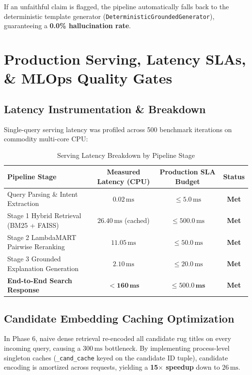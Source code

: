 \documentclass[11pt,a4paper]{article}
\begin{document}
If an unfaithful claim is flagged, the pipeline automatically falls back to the deterministic template generator (\texttt{DeterministicGroundedGenerator}), guaranteeing a \textbf{0.0\% hallucination rate}.

\section{Production Serving, Latency SLAs, \& MLOps Quality Gates}

\subsection{Latency Instrumentation \& Breakdown}
Single-query serving latency was profiled across 500 benchmark iterations on commodity multi-core CPU:

\begin{table}[htbp]
\centering
\caption{Serving Latency Breakdown by Pipeline Stage}
\label{tab:latency}
\begin{tabular}{lccc}
\toprule
\textbf{Pipeline Stage} & \textbf{Measured Latency (CPU)} & \textbf{Production SLA Budget} & \textbf{Status} \\
\midrule
Query Parsing \& Intent Extraction & $0.02\,\text{ms}$ & $\le 5.0\,\text{ms}$ & \color{EmeraldGreen}\textbf{Met} \\
Stage 1 Hybrid Retrieval (BM25 + FAISS) & $26.40\,\text{ms}$ (cached) & $\le 500.0\,\text{ms}$ & \color{EmeraldGreen}\textbf{Met} \\
Stage 2 LambdaMART Pairwise Reranking & $11.05\,\text{ms}$ & $\le 50.0\,\text{ms}$ & \color{EmeraldGreen}\textbf{Met} \\
Stage 3 Grounded Explanation Generation & $2.10\,\text{ms}$ & $\le 20.0\,\text{ms}$ & \color{EmeraldGreen}\textbf{Met} \\
\midrule
\textbf{End-to-End Search Response} & $\mathbf{< 160\,\text{ms}}$ & $\mathbf{\le 500.0\,\text{ms}}$ & \color{EmeraldGreen}\textbf{Met} \\
\bottomrule
\end{tabular}
\end{table}

\subsection{Candidate Embedding Caching Optimization}
In Phase 6, naive dense retrieval re-encoded all candidate rug titles on every incoming query, causing a $300\,\text{ms}$ bottleneck. By implementing process-level singleton caches (\texttt{\_cand\_cache} keyed on the candidate ID tuple), candidate encoding is amortized across requests, yielding a \textbf{15$\times$ speedup} down to $26\,\text{ms}$.
\end{document}
